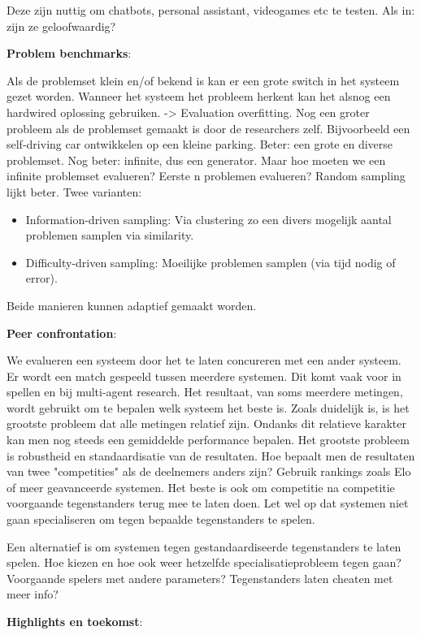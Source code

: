 \documentclass[11pt]{article}
\begin{document}
Deze zijn nuttig om chatbots, personal assistant, videogames etc te testen. Als in: zijn ze geloofwaardig?

\textbf{Problem benchmarks}:

Als de problemset klein en/of bekend is kan er een grote switch in het systeem gezet worden. Wanneer het systeem het probleem herkent kan het alsnog een hardwired oplossing gebruiken. -> Evaluation overfitting. Nog een groter probleem als de problemset gemaakt is door de researchers zelf. Bijvoorbeeld een self-driving car ontwikkelen op een kleine parking. Beter: een grote en diverse problemset. Nog beter: infinite, dus een generator. Maar hoe moeten we een infinite problemset evalueren? Eerste n problemen evalueren? Random sampling lijkt beter. Twee varianten:

\begin{itemize}
\item Information-driven sampling: Via clustering zo een divers mogelijk aantal problemen samplen via similarity.
\item Difficulty-driven sampling: Moeilijke problemen samplen (via tijd nodig of error).
\end{itemize}

Beide manieren kunnen adaptief gemaakt worden.

\textbf{Peer confrontation}:

We evalueren een systeem door het te laten concureren met een ander systeem. Er wordt een match gespeeld tussen meerdere systemen. Dit komt vaak voor in spellen en bij multi-agent research. Het resultaat, van soms meerdere metingen, wordt gebruikt om te bepalen welk systeem het beste is. Zoals duidelijk is, is het grootste probleem dat alle metingen relatief zijn. Ondanks dit relatieve karakter kan men nog steeds een gemiddelde performance bepalen. Het grootste probleem is robustheid en standaardisatie van de resultaten. Hoe bepaalt men de resultaten van twee "competities" als de deelnemers anders zijn? Gebruik rankings zoals Elo of meer geavanceerde systemen. Het beste is ook om competitie na competitie voorgaande tegenstanders terug mee te laten doen. Let wel op dat systemen niet gaan specialiseren om tegen bepaalde tegenstanders te spelen.

Een alternatief is om systemen tegen gestandaardiseerde tegenstanders te laten spelen. Hoe kiezen en hoe ook weer hetzelfde specialisatieprobleem tegen gaan? Voorgaande spelers met andere parameters? Tegenstanders laten cheaten met meer info?

\textbf{Highlights en toekomst}:
\end{document}
